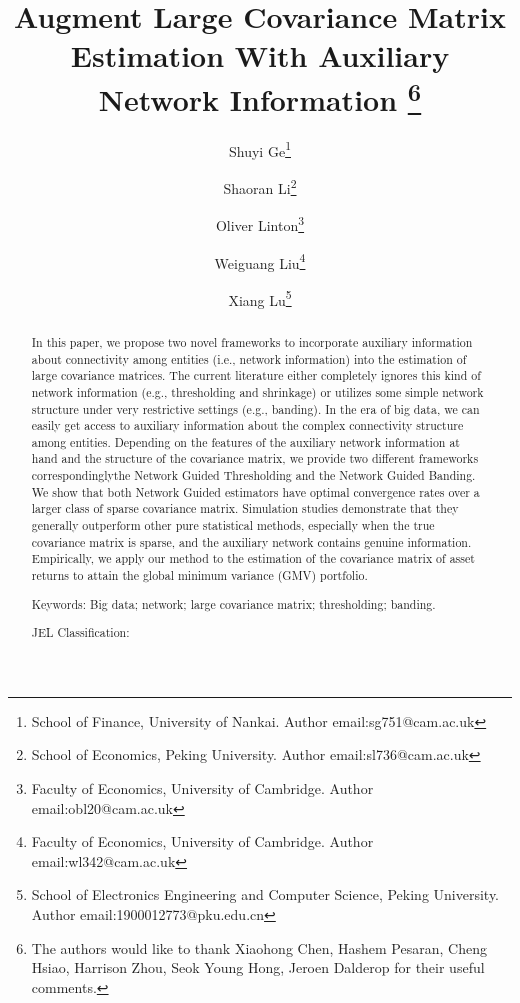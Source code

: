 \documentclass[a4paper]{article}
\begin{document}
\title{Augment Large Covariance Matrix Estimation With Auxiliary Network Information \thanks{The authors would like to thank Xiaohong Chen, Hashem Pesaran, Cheng Hsiao, Harrison Zhou, Seok Young Hong, Jeroen Dalderop for their useful comments.}}
    \author[]{Shuyi Ge\thanks{School of Finance, University of Nankai. Author email:sg751@cam.ac.uk}}
    \author[]{Shaoran Li\thanks{School of Economics, Peking University. Author email:sl736@cam.ac.uk}}
    \author[]{Oliver Linton\thanks{Faculty of Economics, University of Cambridge. Author email:obl20@cam.ac.uk}}
    \author[]{Weiguang Liu\thanks{Faculty of Economics, University of Cambridge. Author email:wl342@cam.ac.uk}}
    \author[]{Xiang Lu\thanks{School of Electronics Engineering and Computer Science, Peking University. Author email:1900012773@pku.edu.cn}}
    \affil[]{}
    \maketitle
\begin{abstract}
In this paper, we propose two novel frameworks to incorporate auxiliary information about connectivity among entities (i.e., network information) into the estimation of large covariance matrices. The current literature either completely ignores this kind of network information (e.g., thresholding and shrinkage) or utilizes some simple network structure under very restrictive settings (e.g., banding). In the era of big data, we can easily get access to auxiliary information about the complex connectivity structure among entities. Depending on the features of the auxiliary network information at hand and the structure of the covariance matrix, we provide two different frameworks correspondingly\textemdash the Network Guided Thresholding and the Network Guided Banding. We show that both Network Guided estimators have optimal convergence rates over a larger class of sparse covariance matrix. Simulation studies demonstrate that they generally outperform other pure statistical methods, especially when the true covariance matrix is sparse, and the auxiliary network contains genuine information. Empirically, we apply our method to the estimation of the covariance matrix of asset returns to attain the global minimum variance (GMV) portfolio.  
\bigskip

Keywords: Big data; network; large covariance matrix; thresholding; banding.

JEL Classification: 
\end{abstract} \hspace{10pt}
\pagebreak
\normalsize
\end{document}
